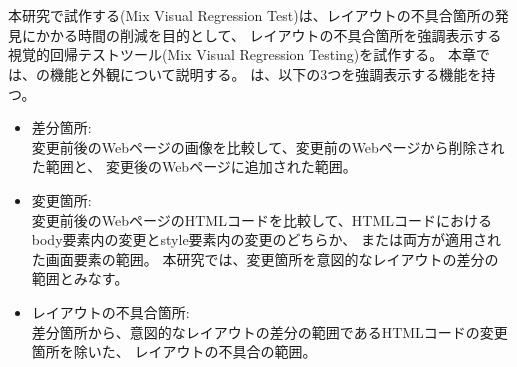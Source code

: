 \chapter{ \toolName}\label{cha:Function}
本研究で試作する\toolName (Mix Visual Regression Test)は、レイアウトの不具合箇所の発見にかかる時間の削減を目的として、
レイアウトの不具合箇所を強調表示する視覚的回帰テストツール\toolName(Mix Visual Regression Testing)を試作する。
本章では、\toolName の機能と外観について説明する。
\toolName は、以下の3つを強調表示する機能を持つ。
\begin{itemize}
    \item 差分箇所:\\
          変更前後のWebページの画像を比較して、変更前のWebページから削除された範囲と、
          変更後のWebページに追加された範囲。
    \item 変更箇所:\\
          変更前後のWebページのHTMLコードを比較して、HTMLコードにおけるbody要素内の変更とstyle要素内の変更のどちらか、
          または両方が適用された画面要素の範囲。
          本研究では、変更箇所を意図的なレイアウトの差分の範囲とみなす。
    \item レイアウトの不具合箇所:\\
          差分箇所から、意図的なレイアウトの差分の範囲であるHTMLコードの変更箇所を除いた、
          レイアウトの不具合の範囲。
\end{itemize}
